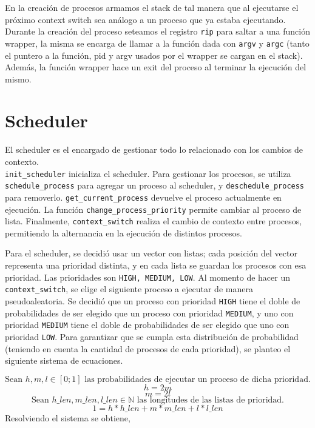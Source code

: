 \documentclass{article}
\begin{document}
En la creación de procesos armamos el stack de tal manera que al ejecutarse el próximo context switch sea análogo a un proceso que ya estaba ejecutando. Durante la creación del proceso seteamos el registro \texttt{rip} para saltar a una función wrapper, la misma se encarga de llamar a la función dada con \texttt{argv} y \texttt{argc} (tanto el puntero a la función, pid y argv usados por el wrapper se cargan en el stack). Además, la función wrapper hace un exit del proceso al terminar la ejecución del mismo.

\section {Scheduler}
El scheduler es el encargado de gestionar todo lo relacionado con los cambios de contexto. \\ \texttt{init\_scheduler} inicializa el scheduler. Para gestionar los procesos, se utiliza \texttt{schedule\_process} para agregar un proceso al scheduler, y \texttt{deschedule\_process} para removerlo. \texttt{get\_current\_process} devuelve el proceso actualmente en ejecución. La función \texttt{change\_process\_priority} permite cambiar al proceso de lista. Finalmente, \texttt{context\_switch} realiza el cambio de contexto entre procesos, permitiendo la alternancia en la ejecución de distintos procesos.

Para el scheduler, se decidió usar un vector con listas; cada posición del vector representa una prioridad distinta, y en cada lista se guardan los procesos con esa prioridad. Las prioridades son \texttt{HIGH, MEDIUM, LOW}.
Al momento de hacer un \texttt{context\_switch}, se elige el siguiente proceso a ejecutar de manera pseudoaleatoria. Se decidió que un proceso con prioridad \texttt{HIGH} tiene el doble de probabilidades de ser elegido que un proceso con prioridad \texttt{MEDIUM}, y uno con prioridad \texttt{MEDIUM} tiene el doble de probabilidades de ser elegido que uno con prioridad \texttt{LOW}. Para garantizar que se cumpla esta distribución de probabilidad (teniendo en cuenta la cantidad de procesos de cada prioridad), se planteo el siguiente sistema de ecuaciones.

\begin{equation*}
\text{Sean } h, m, l \in [0; 1] \text{ las probabilidades de ejecutar un proceso de dicha prioridad.}
\end{equation*}
\begin{equation*}
h = 2m
\end{equation*}
\begin{equation*}
m = 2l
\end{equation*}
\begin{equation*}
\text{Sean } h\_len, m\_len, l\_len \in \mathbb{N} \text{ las longitudes de las listas de prioridad.}
\end{equation*}
\begin{equation*}
1 = h * h\_len + m * m\_len + l * l\_len
\end{equation*}
Resolviendo el sistema se obtiene,
\end{document}
